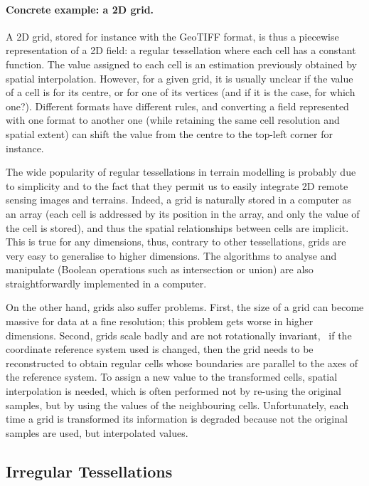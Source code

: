 %

\paragraph{Concrete example: a 2D grid.}
A 2D grid, stored for instance with the GeoTIFF format, is thus a piecewise representation of a 2D field: a regular tessellation where each cell has a constant function.
The value assigned to each cell is an estimation previously obtained by spatial interpolation.
However, for a given grid, it is usually unclear if the value of a cell is for its centre, or for one of its vertices (and if it is the case, for which one?).
Different formats have different rules, and converting a field represented with one format to another one (while retaining the same cell resolution and spatial extent) can shift the value from the centre to the top-left corner for instance.

%

The wide popularity of regular tessellations in terrain modelling is probably due to simplicity and to the fact that they permit us to easily integrate 2D remote sensing images and terrains.
Indeed, a grid is naturally stored in a computer as an array (each cell is addressed by its position in the array, and only the value of the cell is stored), and thus the spatial relationships between cells are implicit. 
This is true for any dimensions, thus, contrary to other tessellations, grids are very easy to generalise to higher dimensions.
The algorithms to analyse and manipulate (Boolean operations such as intersection or union) are also straightforwardly implemented in a computer. 

On the other hand, grids also suffer problems.
First, the size of a grid can become massive for data at a fine resolution; this problem gets worse in higher dimensions.
Second, grids scale badly and are not rotationally invariant, \ie\ if the coordinate reference system used is changed, then the grid needs to be reconstructed to obtain regular cells whose boundaries are parallel to the axes of the reference system.
To assign a new value to the transformed cells, spatial interpolation is needed, which is often performed not by re-using the original samples, but by using the values of the neighbouring cells.
Unfortunately, each time a grid is transformed its information is degraded because not the original samples are used, but interpolated values.



\subsection{Irregular Tessellations} 

